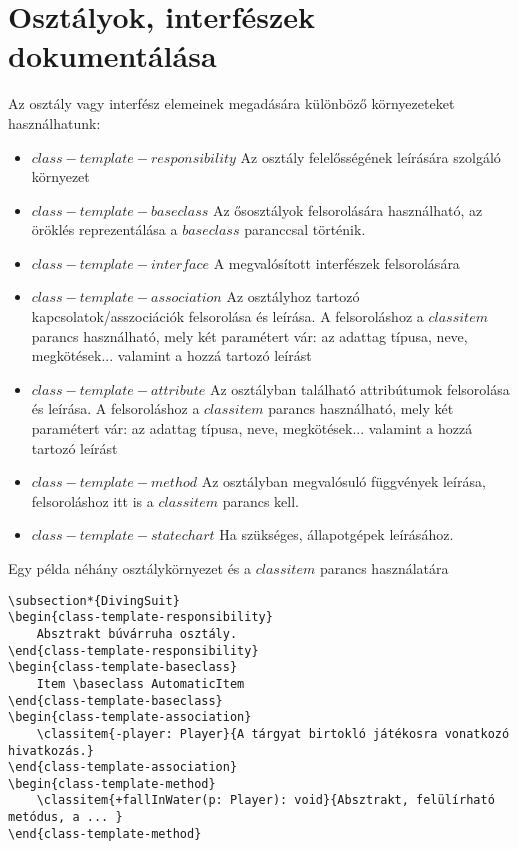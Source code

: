\documentclass[]{article}
\begin{document}
\section{Osztályok, interfészek dokumentálása}
Az osztály vagy interfész elemeinek megadására különböző környezeteket használhatunk: 
\begin{itemize}
    \item $class-template-responsibility$ Az osztály felelősségének leírására szolgáló környezet
    \item $class-template-baseclass$ Az ősosztályok felsorolására használható, az öröklés reprezentálása a $baseclass$ paranccsal történik.
    \item $class-template-interface$ A megvalósított interfészek felsorolására
    \item $class-template-association$ Az osztályhoz tartozó kapcsolatok/asszociációk felsorolása és leírása. A felsoroláshoz a $classitem$ parancs használható, mely két paramétert vár: az adattag típusa, neve, megkötések... valamint a hozzá tartozó leírást
    \item $class-template-attribute$ Az osztályban található attribútumok felsorolása és leírása. A felsoroláshoz a $classitem$ parancs használható, mely két paramétert vár: az adattag típusa, neve, megkötések... valamint a hozzá tartozó leírást
    \item $class-template-method$ Az osztályban megvalósuló függvények leírása, felsoroláshoz itt is a $classitem$ parancs kell.
    \item $class-template-statechart$ Ha szükséges, állapotgépek leírásához.
\end{itemize}
Egy példa néhány osztálykörnyezet és a $classitem$ parancs használatára
\begin{lstlisting}
\subsection*{DivingSuit}
\begin{class-template-responsibility}
    Absztrakt búvárruha osztály.
\end{class-template-responsibility}
\begin{class-template-baseclass}		
    Item \baseclass AutomaticItem
\end{class-template-baseclass}
\begin{class-template-association}
    \classitem{-player: Player}{A tárgyat birtokló játékosra vonatkozó hivatkozás.}
\end{class-template-association}
\begin{class-template-method}
    \classitem{+fallInWater(p: Player): void}{Absztrakt, felülírható metódus, a ... }
\end{class-template-method}
\end{lstlisting}
\end{document}
